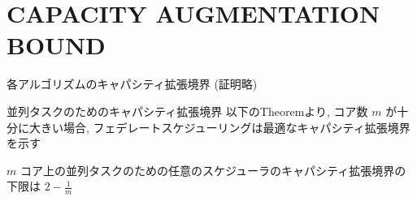 
\section{CAPACITY AUGMENTATION BOUND}
\label{sec: CAPACITY AUGMENTATION BOUND}

\begin{frame}{各アルゴリズムのキャパシティ拡張境界 (証明略)}
\end{frame}

\begin{frame}[label=theorem1]{並列タスクのためのキャパシティ拡張境界}
    以下のTheoremより, コア数 $m$ が十分に大きい場合, フェデレートスケジューリングは最適なキャパシティ拡張境界を示す
    \begin{theorem}[]
        $m$ コア上の並列タスクのための任意のスケジューラのキャパシティ拡張境界の下限は $2-\frac{1}{m}$
    \end{theorem}
\end{frame}

